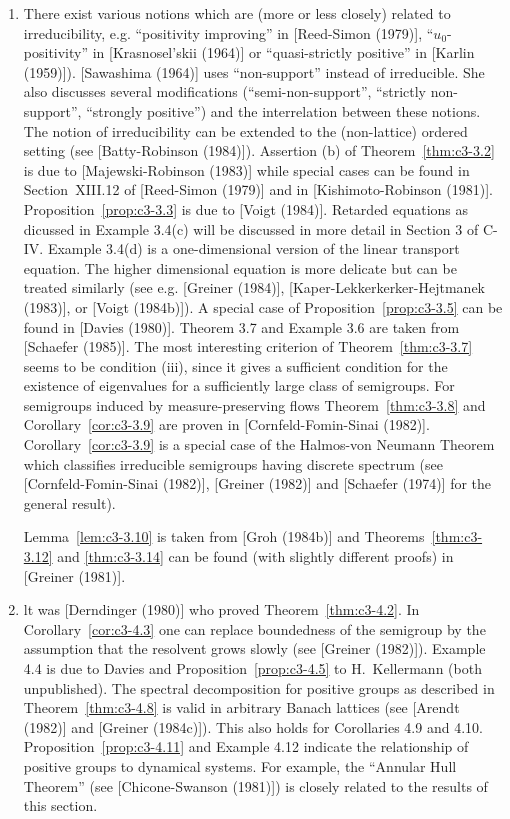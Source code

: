 \begin{enumerate}[label=\emph{Section \arabic*:}, wide]
\item
There exist various notions which are (more or less closely) related to irreducibility, e.g. \enquote{positivity improving} in [Reed-Simon (1979)], \enquote{$u_0$-positivity} in [Krasnosel'skii (1964)] or \enquote{quasi-strictly positive} in [Karlin (1959)]). [Sawashima (1964)] uses \enquote{non-support} instead of irreducible. 
She also discusses several modifications (\enquote{semi-non-support}, \enquote{strictly non-support}, \enquote{strongly positive}) and the interrelation between these notions. 
The notion of irreducibility can be extended to the (non-lattice) ordered setting (see [Batty-Robinson (1984)]). 
Assertion (b) of Theorem~\ref{thm:c3-3.2} is due to [Majewski-Robinson (1983)] while special cases can be found in Section~XIII.12 of [Reed-Simon (1979)] and in [Kishimoto-Robinson (1981)]. 
Proposition~\ref{prop:c3-3.3} is due to [Voigt (1984)]. 
Retarded equations as dicussed in Example 3.4(c) will be discussed in more detail in Section 3 of C-IV. Example 3.4(d) is a one-dimensional version of the linear transport equation. 
The higher dimensional equation is more delicate but can be treated similarly (see e.g. [Greiner (1984)], [Kaper-Lekkerkerker-Hejtmanek (1983)], or [Voigt (1984b)]). 
A special case of Proposition~\ref{prop:c3-3.5} can be found
%
in [Davies (1980)]. 
Theorem 3.7 and Example 3.6 are taken from [Schaefer (1985)]. 
The most interesting criterion of Theorem~\ref{thm:c3-3.7} seems to be condition (iii), since it gives a sufficient condition for the existence of eigenvalues for a sufficiently large class of semigroups. 
For semigroups induced by measure-preserving flows Theorem~\ref{thm:c3-3.8} and Corollary~\ref{cor:c3-3.9} are proven in [Cornfeld-Fomin-Sinai (1982)]. 
Corollary~\ref{cor:c3-3.9} is a special case of the Halmos-von Neumann Theorem which classifies irreducible semigroups having discrete spectrum (see [Cornfeld-Fomin-Sinai (1982)], [Greiner (1982)] and [Schaefer (1974)] for the general result). 

Lemma~\ref{lem:c3-3.10} is taken from [Groh (1984b)] and Theorems~\ref{thm:c3-3.12} and \ref{thm:c3-3.14} can be found (with slightly different proofs) in [Greiner (1981)]. 

\item 
lt was [Derndinger (1980)] who proved Theorem~\ref{thm:c3-4.2}. 
In Corollary~\ref{cor:c3-4.3} one can replace boundedness of the semigroup by the assumption that the resolvent grows slowly (see [Greiner (1982)]). 
Example 4.4 is due to Davies and Proposition~\ref{prop:c3-4.5} to H.~Kellermann (both unpublished). 
The spectral decomposition for positive groups as described in Theorem~\ref{thm:c3-4.8} is valid in arbitrary Banach lattices (see [Arendt  (1982)] and [Greiner (1984c)]). 
This also holds for Corollaries 4.9 and 4.10. 
Proposition~\ref{prop:c3-4.11} and Example 4.12 indicate the relationship of positive groups to dynamical systems. 
For example, the \enquote{Annular Hull Theorem} (see [Chicone-Swanson (1981)]) is closely related to the results of this section.
\end{enumerate}

\endinput
